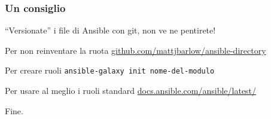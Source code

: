 \documentclass{beamer}
\begin{document}
\begin{frame}
\frametitle{Un consiglio}

``Versionate'' i file di Ansible con git, non ve ne pentirete!

\vspace{2em}

\begin{alertblock}{Per non reinventare la ruota}
	\href{https://github.com/mattjbarlow/ansible-directory}{github.com/mattjbarlow/ansible-directory}
\end{alertblock}

\begin{alertblock}{Per creare ruoli}
	\texttt{ansible-galaxy init nome-del-modulo}
\end{alertblock}

\begin{alertblock}{Per usare al meglio i ruoli standard}
	\href{https://docs.ansible.com/ansible/latest/}{docs.ansible.com/ansible/latest/}
\end{alertblock}

\end{frame}

\begin{frame}

Fine.

\end{frame}

\end{document}
